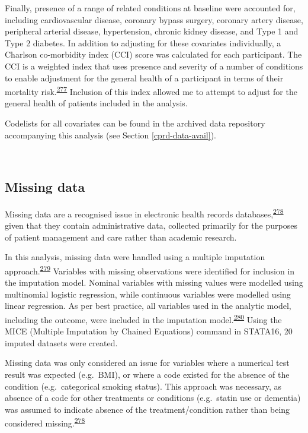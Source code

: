 \documentclass[a4paper, twoside]{templates/ociamthesis}
\begin{document}
Finally, presence of a range of related conditions at baseline were accounted for, including cardiovascular disease, coronary bypass surgery, coronary artery disease, peripheral arterial disease, hypertension, chronic kidney disease, and Type 1 and Type 2 diabetes. In addition to adjusting for these covariates individually, a Charlson co-morbidity index (CCI) score was calculated for each participant. The CCI is a weighted index that uses presence and severity of a number of conditions to enable adjustment for the general health of a participant in terms of their mortality risk.\textsuperscript{\protect\hyperlink{ref-charlson1987new}{277}} Inclusion of this index allowed me to attempt to adjust for the general health of patients included in the analysis.

Codelists for all covariates can be found in the archived data repository accompanying this analysis (see Section \ref{cprd-data-avail}).

~

\hypertarget{missing-data}{%
\subsection{Missing data}\label{missing-data}}

Missing data are a recognised issue in electronic health records databases,\textsuperscript{\protect\hyperlink{ref-wells2013strategies}{278}} given that they contain administrative data, collected primarily for the purposes of patient management and care rather than academic research.

In this analysis, missing data were handled using a multiple imputation approach.\textsuperscript{\protect\hyperlink{ref-sterne2009}{279}} Variables with missing observations were identified for inclusion in the imputation model. Nominal variables with missing values were modelled using multinomial logistic regression, while continuous variables were modelled using linear regression. As per best practice, all variables used in the analytic model, including the outcome, were included in the imputation model.\textsuperscript{\protect\hyperlink{ref-moons2006using}{280}} Using the MICE (Multiple Imputation by Chained Equations) command in STATA16, 20 imputed datasets were created.

Missing data was only considered an issue for variables where a numerical test result was expected (e.g.~BMI), or where a code existed for the absence of the condition (e.g.~categorical smoking status). This approach was necessary, as absence of a code for other treatments or conditions (e.g.~statin use or dementia) was assumed to indicate absence of the treatment/condition rather than being considered missing.\textsuperscript{\protect\hyperlink{ref-wells2013strategies}{278}}
\end{document}
